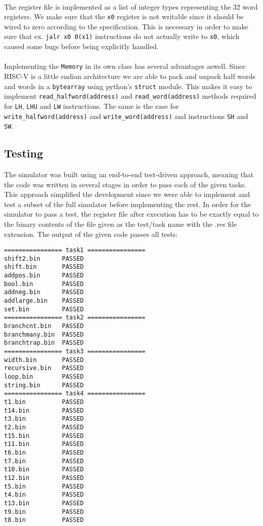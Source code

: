 \documentclass{article}
\begin{document}
\\
The register file is implemented as a list of integer types representing the 32 word registers. We make sure that the \Verb|x0| register is not writable since it should be wired to zero according to the specification. This is necessary in order to make sure that ex. \Verb|jalr x0 0(x1)| instructions do not actually write to \Verb|x0|, which caused some bugs before being explicitly handled.\\
\\
Implementing the \Verb|Memory| in its own class has several advantages aswell. Since RISC-V is a little endian architecture we are able to pack and unpack half words and words in a \Verb|bytearray| using python's \Verb|struct| module. This makes it easy to implement \Verb|read_halfword(address)| and \Verb|read_word(address)| methods required for \Verb|LH|, \Verb|LHU| and \Verb|LW| instructions. The same is the case for \Verb|write_halfword(address)| and \Verb|write_word(address)| and instructions \Verb|SH| and \Verb|SW|.\\
\subsection{Testing}
The simulator was built using an end-to-end test-driven approach, meaning that the code was written in several stages in order to pass each of the given tasks. This approach simplified the development since we were able to implement and test a subset of the full simulator before implementing the rest. In order for the simulator to pass a test, the register file after execution has to be exactly equal to the binary contents of the file given as the test/task name with the .res file extension. The output of the given code passes all tests:
\begin{verbatim}
================ task1 ================
shift2.bin      PASSED
shift.bin       PASSED
addpos.bin      PASSED
bool.bin        PASSED
addneg.bin      PASSED
addlarge.bin    PASSED
set.bin         PASSED
================ task2 ================
branchcnt.bin   PASSED
branchmany.bin  PASSED
branchtrap.bin  PASSED
================ task3 ================
width.bin       PASSED
recursive.bin   PASSED
loop.bin        PASSED
string.bin      PASSED
================ task4 ================
t1.bin          PASSED
t14.bin         PASSED
t3.bin          PASSED
t2.bin          PASSED
t15.bin         PASSED
t11.bin         PASSED
t6.bin          PASSED
t7.bin          PASSED
t10.bin         PASSED
t12.bin         PASSED
t5.bin          PASSED
t4.bin          PASSED
t13.bin         PASSED
t9.bin          PASSED
t8.bin          PASSED
\end{verbatim}
\end{document}
